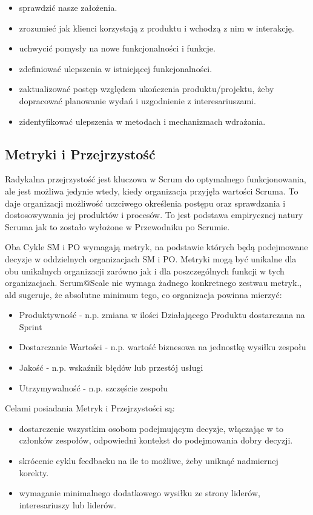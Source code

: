 \documentclass[12pt,a4paper,parskip=full]{scrartcl}
\begin{document}
\begin{itemize}
	\item sprawdzić nasze założenia.
	\item zrozumieć jak klienci korzystają z produktu i wchodzą z nim w interakcję.
	\item uchwycić pomysły na nowe funkcjonalności i funkcje.
	\item zdefiniować ulepszenia w istniejącej funkcjonalności.
	\item zaktualizować postęp względem ukończenia produktu/projektu, żeby dopracować planowanie wydań i uzgodnienie z interesariuszami.
	\item zidentyfikować ulepszenia w metodach i mechanizmach wdrażania.
\end{itemize}

\subsection{Metryki i Przejrzystość}

Radykalna przejrzystość jest kluczowa w Scrum do optymalnego funkcjonowania, ale jest możliwa jedynie wtedy, kiedy organizacja przyjęła wartości Scruma. To daje organizacji możliwość uczciwego określenia postępu oraz sprawdzania i dostosowywania jej produktów i procesów. To jest podstawa empirycznej natury Scruma jak to zostało wyłożone w Przewodniku po Scrumie.

Oba Cykle SM i PO wymagają metryk, na podstawie których będą podejmowane decyzje w oddzielnych organizacjach SM i PO. Metryki mogą być unikalne dla obu unikalnych organizacji zarówno jak i dla poszczególnych funkcji w tych organizacjach. Scrum@Scale nie wymaga żadnego konkretnego zestwau metryk., ald sugeruje, że absolutne minimum tego, co organizacja powinna mierzyć:

\begin{itemize}
	\item Produktywność - n.p. zmiana w ilości Działającego Produktu dostarczana na Sprint
	\item Dostarczanie Wartości - n.p. wartość biznesowa na jednostkę wysiłku zespołu
	\item Jakość - n.p. wskaźnik błędów lub przestój usługi
	\item Utrzymywalność - n.p. szczęście zespołu
\end{itemize}

Celami posiadania Metryk i Przejrzystości są:

\begin{itemize}
	\item dostarczenie wszystkim osobom podejmującym decyzje, włączając w to członków zespołów, odpowiedni kontekst do podejmowania dobry decyzji.
	\item skrócenie cyklu feedbacku na ile to możliwe, żeby uniknąć nadmiernej korekty.
	\item wymaganie minimalnego dodatkowego wysiłku ze strony liderów, interesariuszy lub liderów.
\end{itemize}
\end{document}
